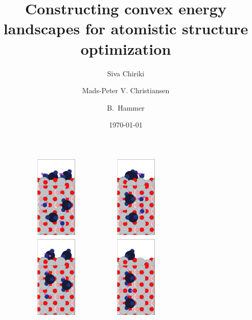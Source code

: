 \documentclass[aip,amsmath,amssymb,reprint, jcp]{revtex4-1}
\begin{document}
\title[]{Constructing convex energy landscapes for atomistic structure optimization}
\author{Siva Chiriki}
\author{Mads-Peter V. Christiansen}
\author{B.\ Hammer}
 
\date{\today}%

\begin{figure}[ht]
  \includegraphics[width=4cm,height=4cm]{V2O5_2H2O_TiO2_101_1by4cell_DFTcsr_Ov_g0.png}  
  \includegraphics[width=4cm,height=4cm]{V2O5_2H2O_TiO2_101_1by4cell_DFTcsr_Ov_g1.png}  
    \includegraphics[width=4cm,height=4cm]{V2O5_2H2O_TiO2_101_1by4cell_DFTcsr_Ov_g2.png}  
      \includegraphics[width=4cm,height=4cm]{V2O5_2H2O_TiO2_101_1by4cell_DFTcsr_Ov_g9.png}  

\end{figure}
\end{document}
